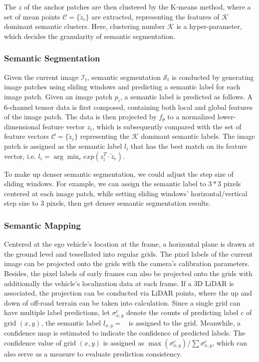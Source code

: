 \documentclass[letterpaper, 10 pt, conference]{ieeeconf}  %
\begin{document}
	The $z$ of the anchor patches are then clustered by the K-means method, where a set of mean points $\mathcal{C}=\{\tilde{z}_c\}$ are extracted, representing the features of $\mathcal{K}$ dominant semantic clusters. Here, clustering number $\mathcal{K}$ is a hyper-parameter, which decides the granularity of semantic segmentation.
	
	\subsubsection{Semantic Segmentation}
	
	Given the current image $\mathcal{I}_t$, semantic segmentation $\mathcal{S}_t$ is conducted by generating image patches using sliding windows and predicting a semantic label for each image patch.
	Given an image patch $p_i$, a semantic label is predicted as follows. A 6-channel tensor data is first composed, containing both local and global features of the image patch. The data is then projected by $f_{\theta}$ to a normalized lower-dimensional feature vector $z_i$, which is subsequently compared with the set of feature vectors $\mathcal{C}=\{\tilde{z}_c\}$ representing the $\mathcal{K}$ dominant semantic labels. The image patch is assigned as the semantic label $l_i$ that has the best match on its feature vector, i.e. $l_i = \arg\min_c exp(z_i^T \cdot \tilde{z}_c)$.
	
	To make up denser semantic segmentation, we could adjust the step size of sliding windows. For example, we can assign the semantic label to $3*3$ pixels centered at each image patch, while setting sliding windows' horizontal/vertical step size to 3 pixels, then get denser semantic segmentation results.
	
	\subsubsection{Semantic Mapping} \label{3_SM}
	
	Centered at the ego vehicle's location at the frame, a horizontal plane is drawn at the ground level and tessellated into regular grids.  
	The pixel labels of the current image can be projected onto the grids with the camera’s calibration parameters. 
	Besides, the pixel labels of early frames can also be projected onto the grids with additionally the vehicle's localization data at each frame.
	If a 3D LiDAR is associated, the projection can be conducted via LiDAR points, where the up and down of off-road terrain can be taken into calculation. 
	Since a single grid can have multiple label predictions, let $\sigma_{x,y}^c$ denote the counts of predicting label $c$ of grid $(x,y)$, the semantic label $l_{x,y}=\mathop{\text{argmax}_{c} (\sigma_{x,y}^c)}$ is assigned to the grid. Meanwhile, a confidence map is estimated to indicate the confidence of predicted labels. The confidence value of grid $(x,y)$ is assigned as $\max(\sigma_{x,y}^c)/\sum{\sigma_{x,y}^c}$, which can also serve as a measure to evaluate prediction consistency.
	
\end{document}
